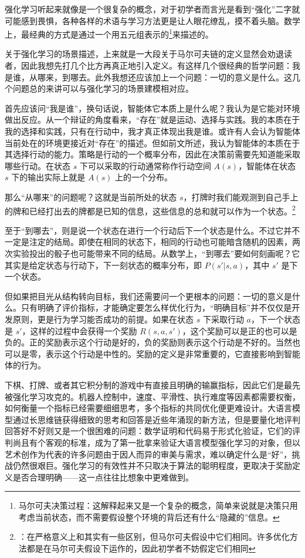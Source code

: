 强化学习听起来就像是一个很复杂的概念，对于初学者而言光是看到“强化”二字就可能感到畏惧，各种各样的术语与学习方法更是让人眼花缭乱，摸不着头脑。数学上，最经典的方式是通过一个用五元组表示的\footnote{马尔可夫决策过程：这解释起来又是一个复杂的概念，简单来说就是决策只用考虑当前状态，而不需要假设整个环境的背后还有什么“隐藏的”信息。}来描述的。

关于强化学习的场景描述，上来就是一大段关于马尔可夫链的定义显然会劝退读者，因此我想先打几个比方再真正地引入定义。有这样几个很经典的哲学问题：我是谁，从哪来，到哪去。此外我想还应该加上一个问题：一切的意义是什么。这几个问题总的来讲可以与强化学习的场景建模相对应。

首先应该问“我是谁”，换句话说，智能体它本质上是什么呢？我认为是它能对环境做出反应。从一个辩证的角度看来，“存在”就是运动、选择与实践。我的本质在于我的选择和实践，只有在行动中，我才真正体现出我是谁。或许有人会认为智能体当前处在的环境更接近对“存在”的描述。但如前文所述，我认为智能体的本质在于其选择行动的能力。策略是行动的一个概率分布，因此在决策前需要先知道能采取哪些行动。在状态 $s$ 下可以采取的行动通常称作行动空间 $A(s)$，智能体在状态 $s$ 下的输出实际上就是 $A(s)$ 上的一个分布。

那么“从哪来”的问题呢？这就是当前所处的状态 $s$，打牌时我们能观测到自己手上的牌和已经打出去的牌都是已知的信息，这些信息的总和就可以作为一个状态。\footnote{：在严格意义上和其实有一些区别，但马尔可夫假设中它们相同。许多优化方法都是在马尔可夫假设下运作的，因此初学者不妨假定它们相同}

至于“到哪去”，则是说一个状态在进行一个行动后下一个状态是什么。不过它并不一定是注定的结局。即使在相同的状态下，相同的行动也可能暗含随机的因素，两次实验投出的骰子也可能带来不同的结局。从数学上，“到哪去”要如何刻画呢？它其实是给定状态与行动下，下一刻状态的概率分布，即 $P(s'|s,a)$，其中 $s'$ 是下一个状态。

但如果把目光从结构转向目标，我们还需要问一个更根本的问题：一切的意义是什么。只有明确了评价指标，才能确定要怎么样优化行为，“明确目标”并不仅仅是开发原则，更是行为学习能否成功的前提。如果在状态 $s$ 下采取行动 $a$，下一个状态是 $s'$，这样的过程中会获得一个奖励 $R(s,a,s')$，这个奖励可以是正的也可以是负的。正的奖励表示这个行动是好的，负的奖励则表示这个行动是不好的。当然也可以是零，表示这个行动是中性的。奖励的定义是非常重要的，它直接影响到智能体的行为。

下棋、打牌、或者其它积分制的游戏中有直接且明确的输赢指标，因此它们是最先被强化学习攻克的。机器人控制中，速度、平滑性、执行难度等因素都需要权衡，如何衡量一个指标已经需要细细思考，多个指标的共同优化便更难设计。大语言模型通过长思维链获得细致的思考和回答是近些年涌现的新方法，但是要量化地评判回答好不好则又是一个很困难的问题：数学证明和代码易于形式化验证，它们的评判尚且有个客观的标准，成为了第一批拿来验证大语言模型强化学习的对象，但以艺术创作为代表的许多问题由于因人而异的审美与需求，难以确定什么是“好”，挑战仍然很艰巨。强化学习的有效性并不只取决于算法的聪明程度，更取决于奖励定义是否合理明确——这一点往往比想象中更难做到。

